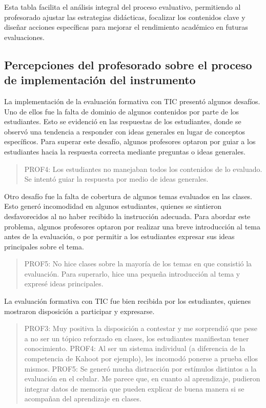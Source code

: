 \documentclass[spanish]{textolivre}
\begin{document}
Esta tabla facilita el análisis integral del proceso evaluativo, permitiendo al profesorado ajustar las estrategias didácticas, focalizar los contenidos clave y diseñar acciones específicas para mejorar el rendimiento académico en futuras evaluaciones.

\subsection{Percepciones del profesorado sobre el proceso de implementación del instrumento}
La implementación de la evaluación formativa con TIC presentó algunos desafíos. Uno de ellos fue la falta de dominio de algunos contenidos por parte de los estudiantes. Esto se evidenció en las respuestas de los estudiantes, donde se observó una tendencia a responder con ideas generales en lugar de conceptos específicos. Para superar este desafío, algunos profesores optaron por guiar a los estudiantes hacia la respuesta correcta mediante preguntas o ideas generales.

\begin{quote}
    PROF4: Los estudiantes no manejaban todos los contenidos de lo evaluado. Se intentó guiar la respuesta por medio de ideas generales.
\end{quote}

Otro desafío fue la falta de cobertura de algunos temas evaluados en las clases. Esto generó incomodidad en algunos estudiantes, quienes se sintieron desfavorecidos al no haber recibido la instrucción adecuada. Para abordar este problema, algunos profesores optaron por realizar una breve introducción al tema antes de la evaluación, o por permitir a los estudiantes expresar sus ideas principales sobre el tema.

\begin{quote}
    PROF5: No hice clases sobre la mayoría de los temas en que consistió la evaluación. Para superarlo, hice una pequeña introducción al tema y expresé ideas principales.
\end{quote}

La evaluación formativa con TIC fue bien recibida por los estudiantes, quienes mostraron disposición a participar y expresarse.

\begin{quote}
    PROF3: Muy positiva la disposición a contestar y me sorprendió que pese a no ser un tópico reforzado en clases, los estudiantes manifiestan tener conocimiento.
\bigskip
\newline
PROF4: Al ser un sistema individual (a diferencia de la competencia de Kahoot por ejemplo), les incomodó ponerse a prueba ellos mismos.
\bigskip
\newline
PROF5: Se generó mucha distracción por estímulos distintos a la evaluación en el celular. Me parece que, en cuanto al aprendizaje, pudieron integrar datos de memoria que pueden explicar de buena manera si se acompañan del aprendizaje en clases.
\end{quote}
\end{document}
